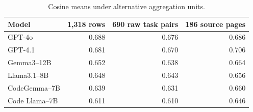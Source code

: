 \begin{table}[H]
\centering\small
\caption{Cosine means under alternative aggregation units.}
\label{tab:aggregation}
\begin{tabular}{@{}lrrr@{}}
\toprule
Model & 1,318 rows & 690 raw task pairs & 186 source pages\\
\midrule
GPT-4o & 0.688 & 0.676 & 0.686\\
GPT-4.1 & 0.681 & 0.670 & 0.706\\
Gemma3--12B & 0.652 & 0.638 & 0.664\\
Llama3.1--8B & 0.648 & 0.643 & 0.656\\
CodeGemma--7B & 0.639 & 0.631 & 0.660\\
Code Llama--7B & 0.611 & 0.610 & 0.646\\
\bottomrule
\end{tabular}
\par\vspace{0.3em}{\footnotesize Pair means average all archived responses within each exact raw documentation pair before giving each pair equal weight. Page means give each URL equal weight.}
\end{table}
